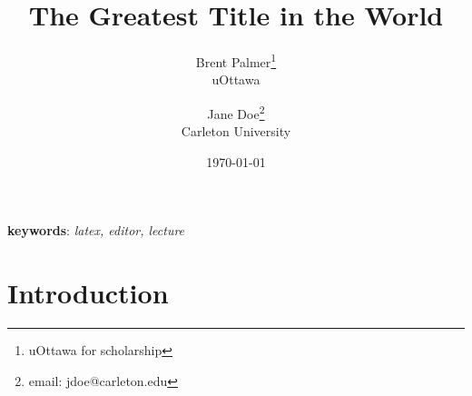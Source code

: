 \documentclass[12pt, twoside]{article}
\title{The Greatest Title in the World}
\author{Brent Palmer\thanks{uOttawa for scholarship}\\uOttawa \and Jane Doe\thanks{email: jdoe@carleton.edu}\\Carleton University}
\date{\today}
\begin{document}

\maketitle

\begin{abstract}
	\lipsum[7]
\end{abstract}

\textbf{keywords}: \emph{latex, editor, lecture}

\section{Introduction}

\lipsum[1-20]

\clearpage

\setcounter{page}{5}



\lipsum[21-100]
\end{document}
